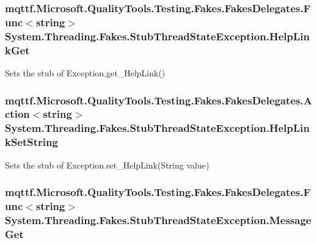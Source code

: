 \hypertarget{class_system_1_1_threading_1_1_fakes_1_1_stub_thread_state_exception_a72e169e01c4703ac15e6edf47d366e39}{
\subsubsection[{Help\-Link\-Get}]{\setlength{\rightskip}{0pt plus 5cm}mqttf.\-Microsoft.\-Quality\-Tools.\-Testing.\-Fakes.\-Fakes\-Delegates.\-Func$<$string$>$ System.\-Threading.\-Fakes.\-Stub\-Thread\-State\-Exception.\-Help\-Link\-Get}}\label{class_system_1_1_threading_1_1_fakes_1_1_stub_thread_state_exception_a72e169e01c4703ac15e6edf47d366e39}


Sets the stub of Exception.\-get\-\_\-\-Help\-Link()

\hypertarget{class_system_1_1_threading_1_1_fakes_1_1_stub_thread_state_exception_abc1b3b6ac7d646add675a090acb7cbbe}{
\subsubsection[{Help\-Link\-Set\-String}]{\setlength{\rightskip}{0pt plus 5cm}mqttf.\-Microsoft.\-Quality\-Tools.\-Testing.\-Fakes.\-Fakes\-Delegates.\-Action$<$string$>$ System.\-Threading.\-Fakes.\-Stub\-Thread\-State\-Exception.\-Help\-Link\-Set\-String}}\label{class_system_1_1_threading_1_1_fakes_1_1_stub_thread_state_exception_abc1b3b6ac7d646add675a090acb7cbbe}


Sets the stub of Exception.\-set\-\_\-\-Help\-Link(\-String value)

\hypertarget{class_system_1_1_threading_1_1_fakes_1_1_stub_thread_state_exception_a1a9a8816fa70bba453695b74a89ecd7a}{
\subsubsection[{Message\-Get}]{\setlength{\rightskip}{0pt plus 5cm}mqttf.\-Microsoft.\-Quality\-Tools.\-Testing.\-Fakes.\-Fakes\-Delegates.\-Func$<$string$>$ System.\-Threading.\-Fakes.\-Stub\-Thread\-State\-Exception.\-Message\-Get}}\label{class_system_1_1_threading_1_1_fakes_1_1_stub_thread_state_exception_a1a9a8816fa70bba453695b74a89ecd7a}


